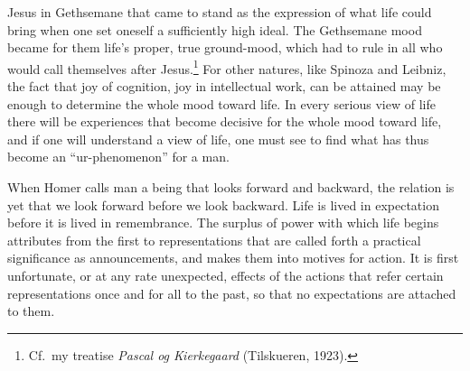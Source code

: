 \documentclass[12pt]{book}
\newcommand{\opage}[1]{\marginnote{\footnotesize\textit{[#1]}}}
\begin{document}
Jesus in Gethsemane that came to stand as the expression of what life could bring when one set oneself a
sufficiently high ideal. The Gethsemane mood became for them life's proper, true \opage{57}ground-mood, which had to
rule in all who would call themselves after Jesus.\footnote{Cf.\ my treatise \textit{Pascal og Kierkegaard}
(Tilskueren, 1923).} For other natures, like Spinoza and Leibniz, the fact that joy of cognition, joy in
intellectual work, can be attained may be enough to determine the whole mood toward life. In every serious
view of life there will be experiences that become decisive for the whole mood toward life, and if one
will understand a view of life, one must see to find what has thus become an ``ur-phenomenon'' for a man.

When Homer calls man a being that looks forward and backward, the relation is yet that we look forward
before we look backward. Life is lived in expectation before it is lived in remembrance. The surplus of
power with which life begins attributes from the first to representations that are called forth a practical
significance as announcements, and makes them into motives for action. It is first unfortunate, or at any
rate unexpected, effects of the actions that refer certain representations once and for all to the past, so
that no expectations are attached to them.
\end{document}
